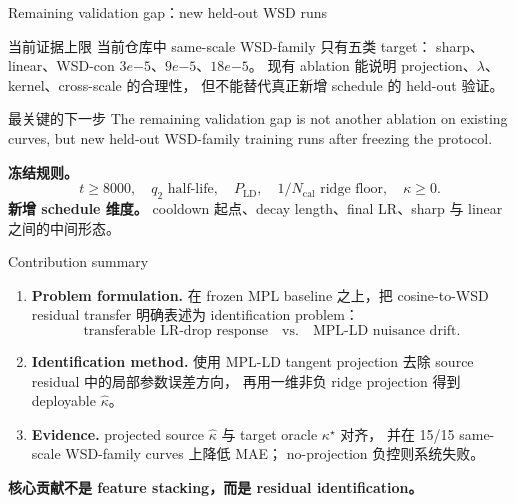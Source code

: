 \documentclass[9pt,aspectratio=169,fontset=fandol]{ctexbeamer}
\newcommand{\hl}[1]{\textcolor{blue!60!black}{\textbf{#1}}}
\begin{document}
\begin{frame}{Remaining validation gap：new held-out WSD runs}
\small
\begin{block}{当前证据上限}
当前仓库中 same-scale WSD-family 只有五类 target：
sharp、linear、WSD-con \(3e{-5}\)、\(9e{-5}\)、\(18e{-5}\)。
现有 ablation 能说明 projection、\(\lambda\)、kernel、cross-scale 的合理性，
但不能替代真正新增 schedule 的 held-out 验证。
\end{block}
\vfill
\begin{alertblock}{最关键的下一步}
The remaining validation gap is not another ablation on existing curves,
but new held-out WSD-family training runs after freezing the protocol.
\end{alertblock}
\vfill
\textbf{冻结规则。}
\[
t\ge8000,\quad
q_2\text{ half-life},\quad
P_{\mathrm{LD}},\quad
1/N_{\mathrm{cal}}\text{ ridge floor},\quad
\kappa\ge0.
\]
\vfill
\textbf{新增 schedule 维度。}
cooldown 起点、decay length、final LR、sharp 与 linear 之间的中间形态。
\end{frame}

\begin{frame}{Contribution summary}
\small
\begin{enumerate}
\item \textbf{Problem formulation.}
在 frozen MPL baseline 之上，把 cosine-to-WSD residual transfer 明确表述为 identification problem：
\[
\text{transferable LR-drop response}
\quad\text{vs.}\quad
\text{MPL-LD nuisance drift}.
\]
\item \textbf{Identification method.}
使用 MPL-LD tangent projection 去除 source residual 中的局部参数误差方向，
再用一维非负 ridge projection 得到 deployable \(\widehat\kappa\)。
\item \textbf{Evidence.}
projected source \(\widehat\kappa\) 与 target oracle \(\kappa^\star\) 对齐，
并在 15/15 same-scale WSD-family curves 上降低 MAE；
no-projection 负控则系统失败。
\end{enumerate}
\vfill
\begin{center}
\hl{核心贡献不是 feature stacking，而是 residual identification。}
\end{center}
\end{frame}
\end{document}
